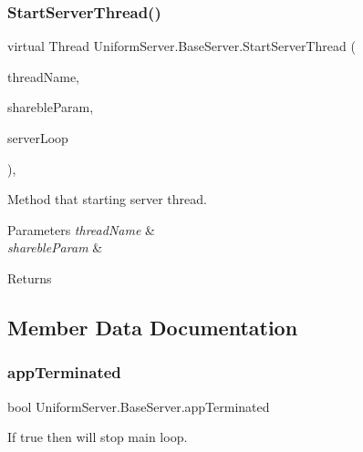 \subsubsection{\texorpdfstring{Start\+Server\+Thread()}{StartServerThread()}}
{\footnotesize\ttfamily virtual Thread Uniform\+Server.\+Base\+Server.\+Start\+Server\+Thread (\begin{DoxyParamCaption}\item[{string}]{thread\+Name,  }\item[{object}]{shareble\+Param,  }\item[{Parameterized\+Thread\+Start}]{server\+Loop }\end{DoxyParamCaption})\hspace{0.3cm}{\ttfamily [protected]}, {\ttfamily [virtual]}}



Method that starting server thread. 


\begin{DoxyParams}{Parameters}
{\em thread\+Name} & \\
\hline
{\em shareble\+Param} & \\
\hline
\end{DoxyParams}
\begin{DoxyReturn}{Returns}

\end{DoxyReturn}


\subsection{Member Data Documentation}
\mbox{\label{class_uniform_server_1_1_base_server_a632ed557976f4d7bd9b41502bb9a262b}} 
\subsubsection{\texorpdfstring{app\+Terminated}{appTerminated}}
{\footnotesize\ttfamily bool Uniform\+Server.\+Base\+Server.\+app\+Terminated\hspace{0.3cm}{\ttfamily [static]}}



If true then will stop main loop. 

\mbox{\label{class_uniform_server_1_1_base_server_a051bdce3aec037df76d8efe3b9938198}} 
